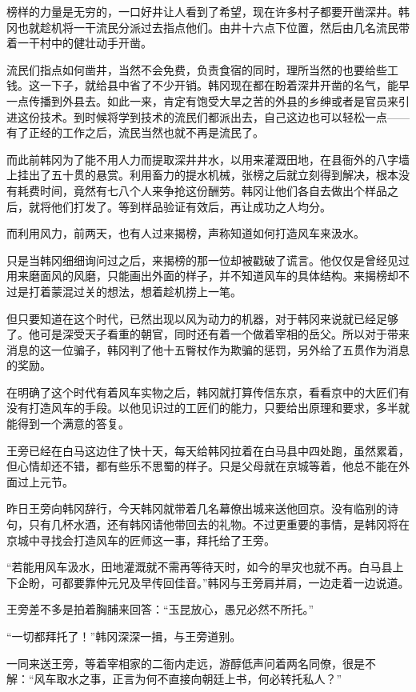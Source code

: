榜样的力量是无穷的，一口好井让人看到了希望，现在许多村子都要开凿深井。韩冈也就趁机将一干流民分派过去指点他们。由井十六点下位置，然后由几名流民带着一干村中的健壮动手开凿。

流民们指点如何凿井，当然不会免费，负责食宿的同时，理所当然的也要给些工钱。这一下子，就给县中省了不少开销。韩冈现在都在盼着深井开凿的名气，能早一点传播到外县去。如此一来，肯定有饱受大旱之苦的外县的乡绅或者是官员来引进这份技术。到时候将学到技术的流民们都派出去，自己这边也可以轻松一点——有了正经的工作之后，流民当然也就不再是流民了。

而此前韩冈为了能不用人力而提取深井井水，以用来灌溉田地，在县衙外的八字墙上挂出了五十贯的悬赏。利用畜力的提水机械，张榜之后就立刻得到解决，根本没有耗费时间，竟然有七八个人来争抢这份酬劳。韩冈让他们各自去做出个样品之后，就将他们打发了。等到样品验证有效后，再让成功之人均分。

而利用风力，前两天，也有人过来揭榜，声称知道如何打造风车来汲水。

只是当韩冈细细询问过之后，来揭榜的那一位却被戳破了谎言。他仅仅是曾经见过用来磨面风的风磨，只能画出外面的样子，并不知道风车的具体结构。来揭榜却不过是打着蒙混过关的想法，想着趁机捞上一笔。

但只要知道在这个时代，已然出现以风为动力的机器，对于韩冈来说就已经足够了。他可是深受天子看重的朝官，同时还有着一个做着宰相的岳父。所以对于带来消息的这一位骗子，韩冈判了他十五臀杖作为欺骗的惩罚，另外给了五贯作为消息的奖励。

在明确了这个时代有着风车实物之后，韩冈就打算传信东京，看看京中的大匠们有没有打造风车的手段。以他见识过的工匠们的能力，只要给出原理和要求，多半就能得到一个满意的答复。

王旁已经在白马这边住了快十天，每天给韩冈拉着在白马县中四处跑，虽然累着，但心情却还不错，都有些乐不思蜀的样子。只是父母就在京城等着，他总不能在外面过上元节。

昨日王旁向韩冈辞行，今天韩冈就带着几名幕僚出城来送他回京。没有临别的诗句，只有几杯水酒，还有韩冈请他带回去的礼物。不过更重要的事情，是韩冈将在京城中寻找会打造风车的匠师这一事，拜托给了王旁。

“若能用风车汲水，田地灌溉就不需再等待天时，如今的旱灾也就不再。白马县上下企盼，可都要靠仲元兄及早传回佳音。”韩冈与王旁肩并肩，一边走着一边说道。

王旁差不多是拍着胸脯来回答：“玉昆放心，愚兄必然不所托。”

“一切都拜托了！”韩冈深深一揖，与王旁道别。

一同来送王旁，等着宰相家的二衙内走远，游醇低声问着两名同僚，很是不解：“风车取水之事，正言为何不直接向朝廷上书，何必转托私人？”

